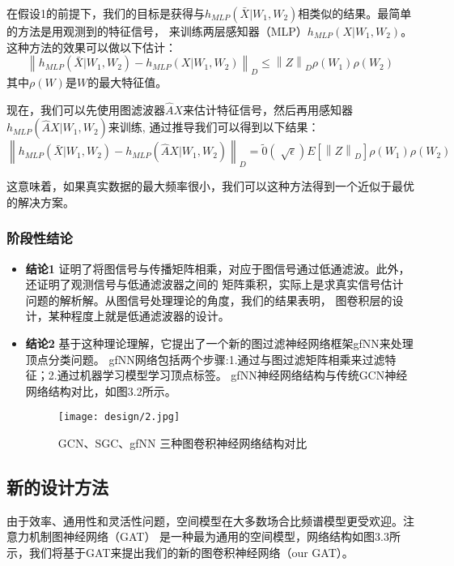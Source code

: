 在假设1的前提下，我们的目标是获得与$ h_{MLP}(\bar{X}|W_1,W_2) $相类似的结果。最简单的方法是用观测到的特征信号，
来训练两层感知器（MLP）$ h_{MLP}(X|W_1,W_2) $。这种方法的效果可以做以下估计：
$$  \left \| h_{MLP}(\bar{X}|W_1,W_2) - h_{MLP}(X|W_1,W_2) \right \|_{D}  \le  \left \| Z \right \|_{D} \rho(W_{1}) \rho(W_{2}) $$
其中$ \rho(W) $是$W$的最大特征值。

现在，我们可以先使用图滤波器$ \hat{A}X $来估计特征信号，然后再用感知器$ h_{MLP}(\hat{A}X|W_1,W_2) $来训练,
通过推导我们可以得到以下结果：
$$  \left \| h_{MLP}(\bar{X}|W_1,W_2) - h_{MLP}(\hat{A}X|W_1,W_2) \right \|_{D}  =  \tilde{0}(\sqrt[]{\epsilon }) E[\left \| Z \right \|_{D}] \rho(W_{1}) \rho(W_{2}) $$

这意味着，如果真实数据的最大频率很小，我们可以这种方法得到一个近似于最优的解决方案。

\subsubsection{阶段性结论}

\begin{itemize}
    \item \textbf{结论1} \quad
    证明了将图信号与传播矩阵相乘，对应于图信号通过低通滤波。此外，还证明了观测信号与低通滤波器之间的
    矩阵乘积，实际上是求真实信号估计问题的解析解。从图信号处理理论的角度，我们的结果表明，
    图卷积层的设计，某种程度上就是低通滤波器的设计。
    
    \item \textbf{结论2} \quad
    基于这种理论理解，它提出了一个新的图过滤神经网络框架gfNN来处理顶点分类问题。
    gfNN网络包括两个步骤:1.通过与图过滤矩阵相乘来过滤特征；2.通过机器学习模型学习顶点标签。
    gfNN神经网络结构与传统GCN神经网络结构对比，如图3.2所示。
    \begin{figure}[ht]
        \centering
        \captionsetup{width=10cm}
        \texttt{[image: design/2.jpg]}
        \caption{\label{3-1}GCN、SGC、gfNN 三种图卷积神经网络结构对比}
    \end{figure}
\end{itemize}

\subsection{新的设计方法}
由于效率、通用性和灵活性问题，空间模型在大多数场合比频谱模型更受欢迎。注意力机制图神经网络（GAT）
是一种最为通用的空间模型，网络结构如图3.3所示，我们将基于GAT来提出我们的新的图卷积神经网络（our GAT）。


